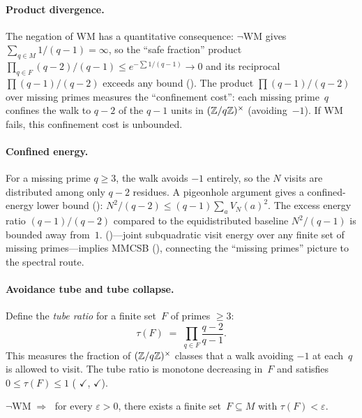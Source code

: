 \paragraph{Product divergence.}
The negation of WM has a quantitative consequence: $\neg\mathrm{WM}$ gives
$\sum_{q \in M} 1/(q{-}1) = \infty$, so the ``safe fraction'' product
$\prod_{q \in F}(q{-}2)/(q{-}1) \leq e^{-\sum 1/(q-1)} \to 0$ and its
reciprocal $\prod (q{-}1)/(q{-}2)$ exceeds any bound
().
The product $\prod (q{-}1)/(q{-}2)$ over missing primes measures the
``confinement cost'': each missing prime~$q$ confines the walk to $q-2$
of the $q-1$ units in $(\mathbb{Z}/q\mathbb{Z})^\times$ (avoiding~$-1$).  If WM
fails, this confinement cost is unbounded.

\paragraph{Confined energy.}
For a missing prime $q \geq 3$, the walk avoids $-1$ entirely, so the
$N$ visits are distributed among only $q-2$ residues.  A pigeonhole
argument gives a confined-energy lower bound
():
$N^2/(q{-}2) \leq (q{-}1)\sum_a V_N(a)^2$.
The excess energy ratio $(q{-}1)/(q{-}2)$ compared to the
equidistributed baseline $N^2/(q{-}1)$ is bounded away from~$1$.
()---joint subquadratic
visit energy over any finite set of missing primes---implies MMCSB
(),
connecting the ``missing primes'' picture to the spectral route.

\paragraph{Avoidance tube and tube collapse.}
Define the \emph{tube ratio} for a finite set~$F$ of primes $\geq 3$:
\[
  \tau(F) \;=\; \prod_{q \in F} \frac{q-2}{q-1}.
\]
This measures the fraction of $(\mathbb{Z}/q\mathbb{Z})^\times$ classes that a walk
avoiding $-1$ at each~$q$ is allowed to visit.  The tube ratio is
monotone decreasing in~$F$ and satisfies $0 \leq \tau(F) \leq 1$
(
{\color{leanink}$\checkmark$},
{\color{leanink}$\checkmark$}).

\begin{theorem}
\label{thm:tube-collapse}
$\neg\mathrm{WM} \;\Longrightarrow\;$ for every $\varepsilon > 0$, there
exists a finite set~$F \subseteq M$ with $\tau(F) < \varepsilon$.
\end{theorem}

